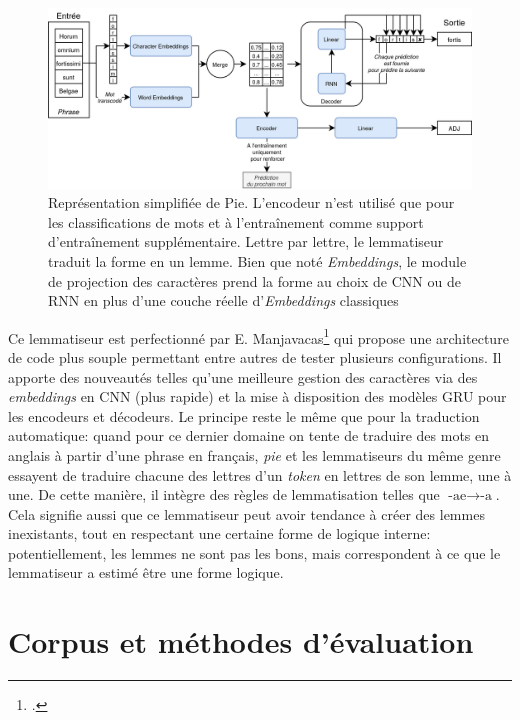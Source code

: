 \begin{figure}[h]
    \centering
    \includegraphics[width=\linewidth]{figures/chap3/outils/Pie.png}
    \caption{Représentation simplifiée de Pie. L'encodeur n'est utilisé que pour les classifications de mots et à l'entraînement comme support d'entraînement supplémentaire. Lettre par lettre, le lemmatiseur traduit la forme en un lemme. Bien que noté \textit{Embeddings}, le module de projection des caractères prend la forme au choix de CNN ou de RNN en plus d'une couche réelle d'\textit{Embeddings} classiques}
    \label{lemmatisation:outils:pie}
\end{figure}

Ce lemmatiseur est perfectionné par E. Manjavacas\footcite{manjavacas_improving_2019} qui propose une architecture de code plus souple permettant entre autres de tester plusieurs configurations. Il apporte des nouveautés telles qu'une meilleure gestion des caractères via des \textit{embeddings} en CNN (plus rapide) et la mise à disposition des modèles GRU pour les encodeurs et décodeurs. Le principe reste le même que pour la traduction automatique: quand pour ce dernier domaine on tente de traduire des mots en anglais à partir d'une phrase en français, \textit{pie} et les lemmatiseurs du même genre essayent de traduire chacune des lettres d'un \textit{token} en lettres de son lemme, une à une. De cette manière, il intègre des règles de lemmatisation telles que \textit{$\textrm{-ae} \rightarrow \textrm{-a}$}. Cela signifie aussi que ce lemmatiseur peut avoir tendance à créer des lemmes inexistants, tout en respectant une certaine forme de logique interne: potentiellement, les lemmes ne sont pas les bons, mais correspondent à ce que le lemmatiseur a estimé être une forme logique. %

\section{Corpus et méthodes d'évaluation}
\label{subsec:lemma_corpus}

